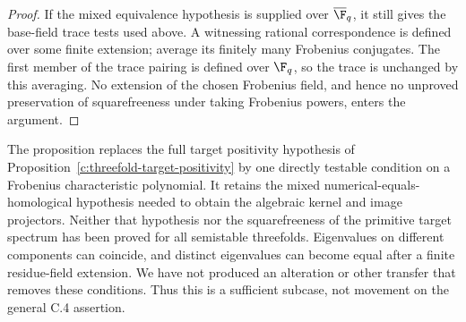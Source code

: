 \begin{proof}
If the mixed equivalence hypothesis is supplied over
$\overline{\F}_q$, it still gives the base-field trace tests used
above. A witnessing rational correspondence is defined over some
finite extension; average its finitely many Frobenius conjugates.
The first member of the trace pairing is defined over $\F_q$, so
the trace is unchanged by this averaging. No extension of the chosen
Frobenius field, and hence no unproved preservation of squarefreeness
under taking Frobenius powers, enters the argument.
\end{proof}

\begin{remark}
\label{c:threefold-simple-spectrum-scope}
The proposition replaces the full target positivity hypothesis of
Proposition~\ref{c:threefold-target-positivity} by one directly testable
condition on a Frobenius characteristic polynomial. It retains the
mixed numerical-equals-homological hypothesis needed to obtain the
algebraic kernel and image projectors. Neither that hypothesis nor the
squarefreeness of the primitive target spectrum has been proved for
all semistable threefolds. Eigenvalues on different components can
coincide, and distinct eigenvalues can become equal after a finite
residue-field extension. We have not produced an alteration or other
transfer that removes these conditions. Thus this is a sufficient
subcase, not movement on the general C.4 assertion.
\end{remark}
